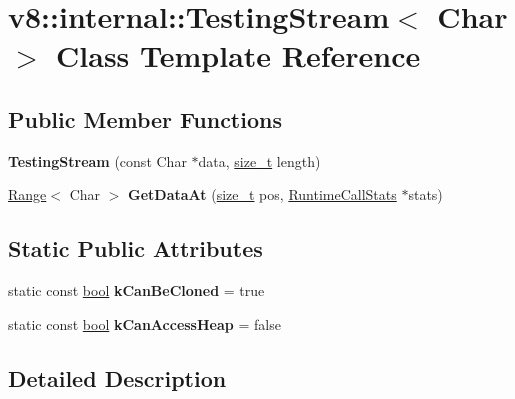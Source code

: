 \hypertarget{classv8_1_1internal_1_1TestingStream}{}\section{v8\+:\+:internal\+:\+:Testing\+Stream$<$ Char $>$ Class Template Reference}
\label{classv8_1_1internal_1_1TestingStream}
\subsection*{Public Member Functions}
\begin{DoxyCompactItemize}
\item 
\mbox{\label{classv8_1_1internal_1_1TestingStream_a5bdce8c5acce0d468264af83a4c240ef}} 
{\bfseries Testing\+Stream} (const Char $\ast$data, \mbox{\hyperlink{classsize__t}{size\+\_\+t}} length)
\item 
\mbox{\label{classv8_1_1internal_1_1TestingStream_adb35a560972f09f03465a941b505e6a8}} 
\mbox{\hyperlink{structv8_1_1internal_1_1Range}{Range}}$<$ Char $>$ {\bfseries Get\+Data\+At} (\mbox{\hyperlink{classsize__t}{size\+\_\+t}} pos, \mbox{\hyperlink{classv8_1_1internal_1_1RuntimeCallStats}{Runtime\+Call\+Stats}} $\ast$stats)
\end{DoxyCompactItemize}
\subsection*{Static Public Attributes}
\begin{DoxyCompactItemize}
\item 
\mbox{\label{classv8_1_1internal_1_1TestingStream_a44e4c6309f83ae6516793e3237cb9321}} 
static const \mbox{\hyperlink{classbool}{bool}} {\bfseries k\+Can\+Be\+Cloned} = true
\item 
\mbox{\label{classv8_1_1internal_1_1TestingStream_ac86389b4df87963ec5c2228e36ce4247}} 
static const \mbox{\hyperlink{classbool}{bool}} {\bfseries k\+Can\+Access\+Heap} = false
\end{DoxyCompactItemize}


\subsection{Detailed Description}
